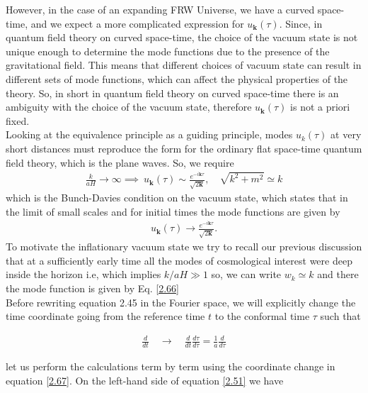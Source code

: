 However, in the case of an expanding FRW Universe, we have a curved space-time, and we expect a more complicated expression for $u_{\mathbf{k}}(\tau)$. Since, in quantum field theory on curved space-time, the choice of the vacuum state is not unique enough to determine the mode functions due to the presence of the gravitational field. This means that different choices of vacuum state can result in different sets of mode functions, which can affect the physical properties of the theory. So, in short in quantum field theory on curved space-time there is an ambiguity with the choice of the vacuum state, therefore $u_{\mathbf{k}}(\tau)$ is not a priori fixed.\\
Looking at the equivalence principle as a guiding principle, modes \(u_{k} (\tau)\) at very short distances must reproduce the form for the ordinary flat space-time quantum field theory, which is the plane waves. So, we require  \begin{align}
    \frac{k}{aH} \rightarrow \infty \implies \  u_{\mathbf{k}}(\tau) \sim \frac{e^{-i \mathbf{k} \tau}}{\sqrt{2\mathbf{k}}}, \quad \sqrt{k^{2}+m^{2}} \simeq k  \label{2.65}   
\end{align}which is the Bunch-Davies condition on the vacuum state, which states that in the limit of small scales and for initial times the mode functions are given by
\begin{align}
    u_{\mathbf{k}}(\tau) \rightarrow \frac{e^{-i \mathbf{k} \tau}} {\sqrt{2\mathbf{k}}}. \label{2.66}
\end{align}
To motivate the inflationary vacuum state we try to recall our previous discussion that at a sufficiently early time all the modes of cosmological interest were deep inside the horizon i.e, which implies $k/aH \gg 1$ so, we can write $w_{k} \simeq k$ and there the mode function is given by Eq. \ref{2.66}\\
\hspace{0.5cm} Before rewriting equation 2.45 in the Fourier space, we will explicitly change the time coordinate going from the reference time $t$ to the conformal time $\tau$ such that

\begin{align}
    \frac{d}{d t} \quad \longrightarrow \quad \frac{d}{d t} \frac{d \tau}{d \tau}=\frac{1}{a} \frac{d}{d \tau} \label{2.67}
\end{align}

let us perform the calculations term by term using the coordinate change in equation \ref{2.67}. On the left-hand side of equation \ref{2.51} we have


